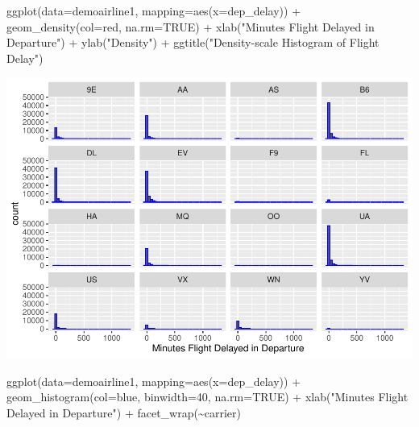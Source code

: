 \documentclass[
]{article}
\newenvironment{Shaded}{\begin{snugshade}}{\end{snugshade}}
\newcommand{\AttributeTok}[1]{\textcolor[rgb]{0.77,0.63,0.00}{#1}}
\newcommand{\ConstantTok}[1]{\textcolor[rgb]{0.00,0.00,0.00}{#1}}
\newcommand{\DecValTok}[1]{\textcolor[rgb]{0.00,0.00,0.81}{#1}}
\newcommand{\FunctionTok}[1]{\textcolor[rgb]{0.00,0.00,0.00}{#1}}
\newcommand{\NormalTok}[1]{#1}
\newcommand{\SpecialCharTok}[1]{\textcolor[rgb]{0.00,0.00,0.00}{#1}}
\newcommand{\StringTok}[1]{\textcolor[rgb]{0.31,0.60,0.02}{#1}}
\begin{document}
\begin{Shaded}
\begin{Highlighting}[]
\FunctionTok{ggplot}\NormalTok{(}\AttributeTok{data=}\NormalTok{demoairline1, }\AttributeTok{mapping=}\FunctionTok{aes}\NormalTok{(}\AttributeTok{x=}\NormalTok{dep\_delay)) }\SpecialCharTok{+} \FunctionTok{geom\_density}\NormalTok{(}\AttributeTok{col=}\StringTok{\textquotesingle{}red\textquotesingle{}}\NormalTok{, }\AttributeTok{na.rm=}\ConstantTok{TRUE}\NormalTok{) }\SpecialCharTok{+} \FunctionTok{xlab}\NormalTok{(}\StringTok{"Minutes Flight Delayed in Departure"}\NormalTok{) }\SpecialCharTok{+} \FunctionTok{ylab}\NormalTok{(}\StringTok{"Density"}\NormalTok{) }\SpecialCharTok{+} \FunctionTok{ggtitle}\NormalTok{(}\StringTok{"Density{-}scale Histogram of Flight Delay"}\NormalTok{)}
\end{Highlighting}
\end{Shaded}

\includegraphics{DataVisua2_files/figure-latex/unnamed-chunk-7-1.pdf}

\begin{Shaded}
\begin{Highlighting}[]
\FunctionTok{ggplot}\NormalTok{(}\AttributeTok{data=}\NormalTok{demoairline1, }\AttributeTok{mapping=}\FunctionTok{aes}\NormalTok{(}\AttributeTok{x=}\NormalTok{dep\_delay)) }\SpecialCharTok{+} \FunctionTok{geom\_histogram}\NormalTok{(}\AttributeTok{col=}\StringTok{\textquotesingle{}blue\textquotesingle{}}\NormalTok{, }\AttributeTok{binwidth=}\DecValTok{40}\NormalTok{, }\AttributeTok{na.rm=}\ConstantTok{TRUE}\NormalTok{) }\SpecialCharTok{+} \FunctionTok{xlab}\NormalTok{(}\StringTok{"Minutes Flight Delayed in Departure"}\NormalTok{) }\SpecialCharTok{+} \FunctionTok{facet\_wrap}\NormalTok{(}\SpecialCharTok{\textasciitilde{}}\NormalTok{carrier)}
\end{Highlighting}
\end{Shaded}
\end{document}

